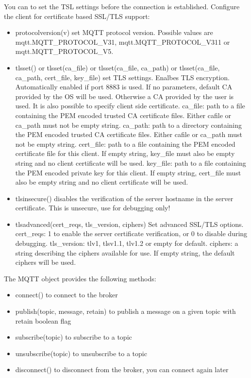 You can to set the TSL settings before the connection is established.
Configure the client for certificate based SSL/TLS support:
\begin{itemize}
\item protocolversion(v) set MQTT protocol version. Possible values are mqtt.MQTT\_PROTOCOL\_V31, mqtt.MQTT\_PROTOCOL\_V311 or mqtt.MQTT\_PROTOCOL\_V5.
\item tlsset() or tlsset(ca\_file) or tlsset(ca\_file, ca\_path) or tlsset(ca\_file, ca\_path, cert\_file, key\_file) set TLS settings.
Enalbes TLS encryption. Automatically enabled if port 8883 is used. If no parameters, default CA provided by the OS will be used.
Otherwise a CA provided by the user is used. It is also possible to specify client side certificate.
ca\_file: path to a file containing the PEM encoded trusted CA certificate files. Either cafile or ca\_path must not be empty string.
ca\_path: path to a directory containing the PEM encoded trusted CA certificate files. Either cafile or ca\_path must not be empty string.
cert\_file: path to a file containing the PEM encoded certificate file for this client. If empty string, key\_file must also be empty string and no client certificate will be used.
key\_file: path to a file containing the PEM encoded private key for this client. If empty string, cert\_file must also be empty string and no client certificate will be used.
\item tlsinsecure() disables the verification of the server hostname in the server certificate. This is unsecure, use for debugging only!
\item tlsadvanced(cert\_reqs, tls\_version, ciphers) Set advanced SSL/TLS options.
cert\_reqs: 1 to enable the server certificate verification, or 0 to disable during debugging.
tls\_version: tlv1, tlsv1.1, tlv1.2 or empty for default.
ciphers: a string describing the ciphers available for use. If empty string, the default ciphers will be used.
\end{itemize}

The MQTT object provides the following methods:
\begin{itemize}
\item connect() to connect to the broker
\item publish(topic, message, retain) to publish a message on a given topic with retain boolean flag
\item subscribe(topic) to subscribe to a topic
\item unsubscribe(topic) to unsubscribe to a topic
\item disconnect() to disconnect from the broker, you can connect again later
\end{itemize}

